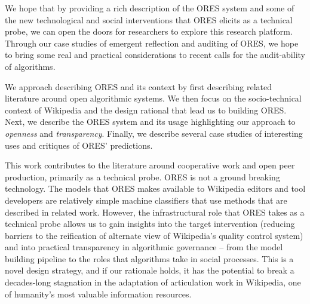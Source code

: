 We hope that by providing a rich description of the ORES system and some of the new technological and social interventions that ORES elicits as a technical probe\cite{hutchinson2003technology}, we can open the doors for researchers to explore this research platform\cite{terveen2014study}.  Through our case studies of emergent reflection and auditing of ORES, we hope to bring some real and practical considerations to recent calls for the audit-ability of algorithms\cite{sandvig2014auditing}.

We approach describing ORES and its context by first describing related literature around open algorithmic systems.  We then focus on the socio-technical context of Wikipedia and the design rational that lead us to building ORES.  Next, we describe the ORES system and its usage highlighting our approach to \emph{openness} and \emph{transparency}.  Finally, we describe several case studies of interesting uses and critiques of ORES' predictions.

This work contributes to the literature around cooperative work and open peer production, primarily as a technical probe.  ORES is not a ground breaking technology.  The models that ORES makes available to Wikipedia editors and tool developers are relatively simple machine classifiers that use methods that are described in related work.  However, the infrastructural role that ORES takes as a technical probe allows us to gain insights into the target intervention (reducing barriers to the reification of alternate view of Wikipedia's quality control system) and into practical transparency in algorithmic governance -- from the model building pipeline to the roles that algorithms take in social processes.  This is a novel design strategy, and if our rationale holds, it has the potential to break a decades-long stagnation in the adaptation of articulation work in Wikipedia, one of humanity's most valuable information resources.
